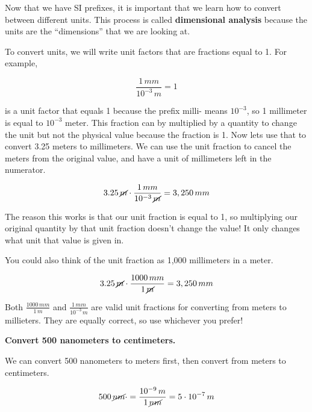 \documentclass[12pt]{book}
\begin{document}
Now that we have SI prefixes, it is important that we learn how to convert between different units. This process is called \textbf{dimensional analysis} because the units are the ``dimensions'' that we are looking at.

To convert units, we will write unit factors that are fractions equal to 1. For example, 

\begin{equation}
\frac{1 \, mm}{10^{-3} \, m} = 1
\end{equation}

is a unit factor that equals 1 because the prefix milli- means $10^{-3}$, so 1 millimeter is equal to $10^{-3}$ meter. This fraction can by multiplied by a quantity to change the unit but not the physical value because the fraction is 1. Now lets use that to convert 3.25 meters to millimeters. We can use the unit fraction to cancel the meters from the original value, and have a unit of millimeters left in the numerator.

\begin{equation}
3.25 \, \cancel{m} \cdot \frac{1 \, mm}{10^{-3} \, \cancel{m}} = 3,250 \, mm
\end{equation}


The reason this works is that our unit fraction is equal to 1, so multiplying our original quantity by that unit fraction doesn't change the value! It only changes what unit that value is given in.

You could also think of the unit fraction as 1,000 millimeters in a meter.

\begin{equation}
3.25 \, \cancel{m} \cdot \frac{1000 \, mm}{1 \, \cancel{m}} = 3,250 \, mm
\end{equation}

Both $\frac{1000 \, mm}{1 \, m}$ and $\frac{1 \, mm}{10^{-3} \, m}$ are valid unit fractions for converting from meters to millieters. They are equally correct, so use whichever you prefer!

\linespace

\example

\textbf{Convert 500 nanometers to centimeters.}

\hspace{10pt}

We can convert 500 nanometers to meters first, then convert from meters to centimeters.

\begin{equation}
500 \, \cancel{nm} \cdot = \frac{10^{-9} \, m}{1 \, \cancel{nm}} = 5 \cdot 10^{-7} \, m
\end{equation}
\end{document}
